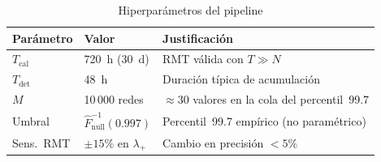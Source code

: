 \begin{table}[htbp]
  \caption{Hiperparámetros del pipeline}
  \label{tab:hyperparams}
  \centering
  \begin{tabular}{l l p{3.8cm}}
    \hline
    \textbf{Parámetro} & \textbf{Valor} & \textbf{Justificación} \\
    \hline
    $T_{\text{cal}}$ & 720~h (30~d) & RMT válida con $T \gg N$ \\
    $T_{\text{det}}$ & 48~h & Duración típica de acumulación~\cite{lamorgia2020} \\
    $M$ & 10\,000 redes & ${\approx}30$ valores en la cola del percentil~99.7 \\
    Umbral & $\hat{F}_{\text{null}}^{-1}(0.997)$ & Percentil~99.7 empírico (no paramétrico) \\
    Sens.\ RMT & ${\pm}15\%$ en $\lambda_+$ & Cambio en precisión $< 5\%$ \\
    \hline
  \end{tabular}
\end{table}
